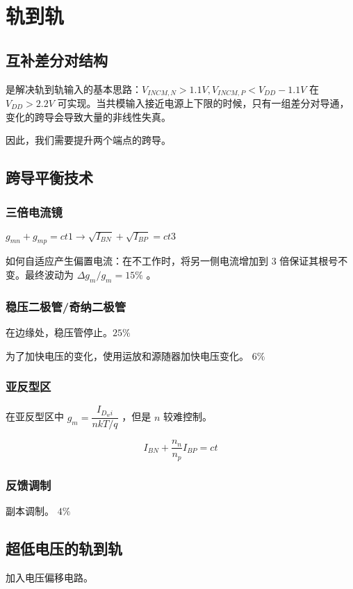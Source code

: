 \documentclass[cn,11pt,chinese,black,simple]{../elegantbook}
\begin{document}
\fi 
\def\chapname{07r2r}

\chapter{轨到轨}

\section{互补差分对结构}

是解决轨到轨输入的基本思路：\(V_{INCM,N} > 1.1 V, V_{INCM, P} < V_{DD} - 1.1 V\) 在 \(V_{DD} > 2.2 V \) 可实现。当共模输入接近电源上下限的时候，只有一组差分对导通，变化的跨导会导致大量的非线性失真。

因此，我们需要提升两个端点的跨导。

\section{跨导平衡技术}

\subsection{三倍电流镜}

\(g_{mn} + g_{mp} = ct1 \rightarrow \sqrt{I_{BN}} + \sqrt{I_{BP}} = ct3\)

如何自适应产生偏置电流：在不工作时，将另一侧电流增加到 3 倍保证其根号不变。最终波动为 \(\Delta g_m / g_m = 15 \%\) 。

\subsection{稳压二极管/奇纳二极管}

在边缘处，稳压管停止。\(25 \%\)

为了加快电压的变化，使用运放和源随器加快电压变化。 \(6 \%\)

\subsection{亚反型区}

在亚反型区中 \(g_m = \dfrac{I_{D_wi}}{nkT/q}\) ，但是 \(n\) 较难控制。

\[I_{BN} + \frac{n_n}{n_p} I_{BP} = ct\]

\subsection{反馈调制}

副本调制。 \(4\%\) 


\section{超低电压的轨到轨}

加入电压偏移电路。


\let\chapname\undefined
\ifx\mainclass\undefined
\end{document}
